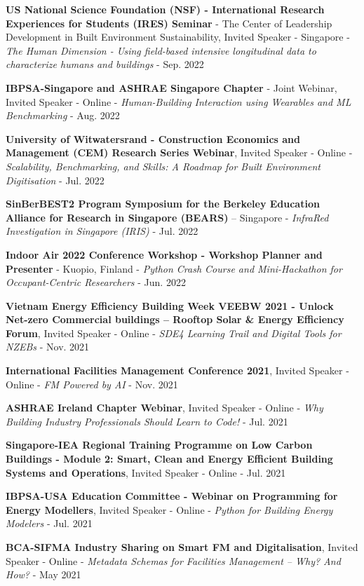 \documentclass[10pt,a4paper]{article}
\begin{document}
\begin{small}
\begin{etaremune}
\item
\textbf{US National Science Foundation (NSF) - International Research Experiences for Students (IRES) Seminar} - The Center of Leadership Development in Built Environment Sustainability, Invited Speaker - Singapore - \emph{The Human Dimension - Using field-based intensive longitudinal data to characterize humans and buildings} - Sep. 2022
\item
\textbf{IBPSA-Singapore and ASHRAE Singapore Chapter} - Joint Webinar, Invited Speaker - Online - \emph{Human-Building Interaction using Wearables and ML Benchmarking} - Aug. 2022
\item
\textbf{University of Witwatersrand - Construction Economics and Management (CEM) Research Series Webinar}, Invited Speaker - Online - \emph{Scalability, Benchmarking, and Skills: A Roadmap for Built Environment Digitisation} - Jul. 2022
\item
\textbf{SinBerBEST2 Program Symposium for the Berkeley Education Alliance for Research in Singapore (BEARS)} – Singapore - \emph{InfraRed Investigation in Singapore (IRIS)} - Jul. 2022
\item
\textbf{Indoor Air 2022 Conference Workshop - Workshop Planner and Presenter} - Kuopio, Finland - \emph{Python Crash Course and Mini-Hackathon for Occupant-Centric Researchers} - Jun. 2022
\item
\textbf{Vietnam Energy Efficiency Building Week VEEBW 2021 - Unlock Net-zero Commercial buildings – Rooftop Solar \& Energy Efficiency Forum}, Invited Speaker - Online - \emph{SDE4 Learning Trail and Digital Tools for NZEBs} - Nov. 2021
\item
\textbf{International Facilities Management Conference 2021}, Invited Speaker - Online - \emph{FM Powered by AI} - Nov. 2021
\item
\textbf{ASHRAE Ireland Chapter Webinar}, Invited Speaker - Online - \emph{Why Building Industry Professionals Should Learn to Code!} - Jul. 2021
\item
\textbf{Singapore-IEA Regional Training Programme on Low Carbon Buildings - Module 2: Smart, Clean and Energy Efficient Building Systems and Operations}, Invited Speaker - Online - Jul. 2021
\item
\textbf{IBPSA-USA Education Committee - Webinar on Programming for Energy Modellers}, Invited Speaker - Online - \emph{Python for Building Energy Modelers}  - Jul. 2021
\item
\textbf{BCA-SIFMA Industry Sharing on Smart FM and Digitalisation}, Invited Speaker - Online - \emph{Metadata Schemas for Facilities Management – Why? And How?} - May 2021

\end{etaremune}
\end{small}
\end{document}
